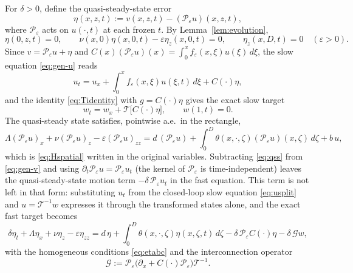 \documentclass[12pt]{article}
\theoremstyle{plain}
\theoremstyle{remark}
\newcommand{\PP}{\mathcal P}
\newcommand{\TT}{\mathcal T}
\begin{document}
For $\delta>0$, define the quasi-steady-state error
\begin{equation}
 \eta(x,z,t):=v(x,z,t)-(\PP_\varepsilon u)(x,z,t),
 \label{eq:etadef}
\end{equation}
where $\PP_\varepsilon$ acts on $u(\cdot,t)$ at each frozen $t$. By Lemma~\ref{lem:evolution},
\begin{equation}
 \eta(0,z,t)=0,
 \qquad
 \nu(x,0)\eta(x,0,t)-\varepsilon\eta_z(x,0,t)=0,
 \qquad
 \eta_z(x,D,t)=0\quad(\varepsilon>0).
 \label{eq:etabc}
\end{equation}
Since $v=\PP_\varepsilon u+\eta$ and $C(x)(\PP_\varepsilon u)(x)=\int_0^xf_\varepsilon(x,\xi)u(\xi)\,d\xi$, the slow equation \eqref{eq:gen-u} reads
\begin{equation}
 u_t=u_x+\int_0^xf_\varepsilon(x,\xi)u(\xi,t)\,d\xi+C(\cdot)\eta,
 \label{eq:usplit}
\end{equation}
and the identity \eqref{eq:Tidentity} with $g=C(\cdot)\eta$ gives the exact slow target
\begin{equation}
 w_t=w_x+\TT\big[C(\cdot)\eta\big],\qquad w(1,t)=0 .
 \label{eq:wtarget}
\end{equation}
The quasi-steady state satisfies, pointwise a.e.\ in the rectangle,
\begin{equation}
 \Lambda(\PP_\varepsilon u)_x+\nu(\PP_\varepsilon u)_z-\varepsilon(\PP_\varepsilon u)_{zz}
 =d\,(\PP_\varepsilon u)+\int_0^D\theta(x,\cdot,\zeta)(\PP_\varepsilon u)(x,\zeta)\,d\zeta+b\,u,
 \label{eq:qss}
\end{equation}
which is \eqref{eq:Hspatial} written in the original variables. Subtracting \eqref{eq:qss} from \eqref{eq:gen-v} and using $\partial_t\PP_\varepsilon u=\PP_\varepsilon u_t$ (the kernel of $\PP_\varepsilon$ is time-independent) leaves the quasi-steady-state motion term $-\delta\,\PP_\varepsilon u_t$ in the fast equation. This term is not left in that form: substituting $u_t$ from the closed-loop slow equation \eqref{eq:usplit} and $u=\TT^{-1}w$ expresses it through the transformed states alone, and the exact fast target becomes
\begin{equation}
 \delta\eta_t+\Lambda\eta_x+\nu\eta_z-\varepsilon\eta_{zz}
 =d\,\eta+\int_0^D\theta(x,\cdot,\zeta)\eta(x,\zeta,t)\,d\zeta
 -\delta\,\PP_\varepsilon C(\cdot)\eta
 -\delta\,\mathcal Gw,
 \label{eq:etatarget}
\end{equation}
with the homogeneous conditions \eqref{eq:etabc} and the interconnection operator
\begin{equation}
 \mathcal G:=\PP_\varepsilon\big(\partial_x+C(\cdot)\PP_\varepsilon\big)\TT^{-1} .
 \label{eq:Gdef}
\end{equation}
\end{document}
